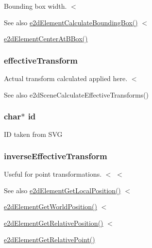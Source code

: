 Bounding box width. $<$ \begin{DoxySeeAlso}{See also}
\hyperlink{group__e2d_element_ga94aa710b2da71af2091fe4d5b87ce47e}{e2d\-Element\-Calculate\-Bounding\-Box()} $<$ 

\hyperlink{group__e2d_element_ga36b01a888c97163c990e16d348aff61c}{e2d\-Element\-Center\-At\-B\-Box()} 
\end{DoxySeeAlso}
\hypertarget{structe2d_element_a6c8e26945f09b5157e2111e42f99b879}{
\subsubsection[{effective\-Transform}]{ {\bf effective\-Transform}}}\label{structe2d_element_a6c8e26945f09b5157e2111e42f99b879}
Actual transform calculated applied here. $<$ \begin{DoxySeeAlso}{See also}
e2d\-Scene\-Calculate\-Effective\-Transforms() 
\end{DoxySeeAlso}
\hypertarget{structe2d_element_aecb3b0d045ada529257a2fbf8f829599}{
\subsubsection[{id}]{\setlength{\rightskip}{0pt plus 5cm}char$\ast$ {\bf id}}}\label{structe2d_element_aecb3b0d045ada529257a2fbf8f829599}
I\-D taken from S\-V\-G \hypertarget{structe2d_element_a5e6d7341f2dbef1923b0a3fcc13781c6}{
\subsubsection[{inverse\-Effective\-Transform}]{ {\bf inverse\-Effective\-Transform}}}\label{structe2d_element_a5e6d7341f2dbef1923b0a3fcc13781c6}
Useful for point transformations. $<$ $<$ \begin{DoxySeeAlso}{See also}
\hyperlink{group__e2d_element_ga39dd883e42f609efba3f75300a29ff31}{e2d\-Element\-Get\-Local\-Position()} $<$ 

\hyperlink{group__e2d_element_ga9b85de42e52c0d89e82f9231ea923c8c}{e2d\-Element\-Get\-World\-Position()} $<$ 

\hyperlink{group__e2d_element_gab4e3f4eeba31c937a946f68617c5cb06}{e2d\-Element\-Get\-Relative\-Position()} $<$ 

\hyperlink{group__e2d_element_gac3ad9f8cdc0782378c9f2e93cb7da68f}{e2d\-Element\-Get\-Relative\-Point()} 
\end{DoxySeeAlso}
